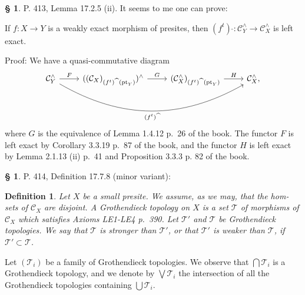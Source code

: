 \documentclass[12pt]{article}%
\newtheorem{df}[thm]{Definition}%
\theoremstyle{remark}
\theoremstyle{definition}
\newtheorem{s}[thm]{\S}%
\newcommand{\cc}{\mathcal}
\newcommand{\oo}{\operatorname}
\newcommand{\C}{\mathcal C}
\begin{document}
%

\begin{s}%
P. 413, Lemma 17.2.5 (ii). It seems to me one can prove: 

If $f:X\to Y$ is a weakly exact morphism of presites, then $(f^t)\ \widehat{}:\C_Y^\wedge\to\C_X^\wedge$ is left exact. 

Proof: We have a quasi-commutative diagram 
$$
\begin{tikzcd}
\C_Y^\wedge\ar{r}{F}\ar[bend right]{rrr}[swap]{(f^t)\,\,\widehat{}}&((\C_X)_{(f^t)\,\,\widehat{}\,\,(\oo{pt}_Y)})^\wedge\ar{r}{G}&(\C_X^\wedge)_{(f^t)\,\,\widehat{}\,\,(\oo{pt}_Y)}\ar{r}{H}&\C_X^\wedge,
\end{tikzcd}
$$ 
where $G$ is the equivalence of Lemma 1.4.12 p.~26 of the book. The functor $F$ is left exact by Corollary 3.3.19 p.~87 of the book, and the functor $H$ is left exact by Lemma 2.1.13 (ii) p.~41 and Proposition 3.3.3 p. 82 of the book.
\end{s}

%

\begin{s} 
P. 414, Definition 17.7.8 (minor variant):
%
\begin{df}\label{1778}
Let $X$ be a small presite. We assume, as we may, that the hom-sets of $\C_X$ are disjoint. A {\em Grothendieck topology} on $X$ is a set $\cc T$ of morphisms of $\C_X$ which satisfies Axioms LE1-LE4 p.~390. Let $\cc T'$ and $\cc T$ be Grothendieck topologies. We say that $\cc T$ is {\em stronger than} $\cc T'$, or that $\cc T'$ is {\em weaker than} $\cc T$, if $\cc T'\subset\cc T$. 
\end{df}
%
Let $(\cc T_i)$ be a family of Grothendieck topologies. We observe that $\bigcap\cc T_i$ is a Grothendieck topology, and we denote by $\bigvee\cc T_i$ the intersection of all the Grothendieck topologies containing $\bigcup\cc T_i$.
\end{s}

%
\end{document}
